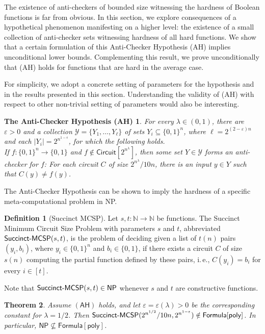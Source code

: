 \documentclass[11pt]{article}
\numberwithin{equation}{section}
\newtheorem{theorem}{Theorem}[section]
\theoremstyle{definition}
\newtheorem{definition}[theorem]{Definition}
\theoremstyle{plain}
\newcommand{\ie}{i.\,e.}
\newtheorem*{antichecker}{The Anti-Checker Hypothesis (AH)}
\newcommand{\MCSP}{\ensuremath{{\sf MCSP}}\xspace}
\newcommand{\Succinct}{\ensuremath{{\sf Succinct}\text{-}\ensuremath{\MCSP}}\xspace}
\begin{document}
The existence of anti-checkers of bounded size witnessing the hardness of Boolean functions is far from obvious. In this section, we explore consequences of a hypothetical phenomenon manifesting on a higher level: the existence of a small collection of anti-checker sets witnessing hardness of all hard functions. We show that a certain formulation of this Anti-Checker Hypothesis (AH) implies unconditional lower bounds. Complementing this result, we prove unconditionally that (AH) holds for functions that are hard in the average case.
 
For simplicity, we adopt a concrete setting of parameters for the hypothesis and in the results presented in this section. Understanding the validity of (AH) with respect to other non-trivial setting of parameters would also be interesting.

\begin{antichecker} For every $\lambda\in (0,1)$, there are $\varepsilon >0$ and a collection $\mathcal{Y} = \{Y_1, \ldots, Y_\ell\}$ of sets $Y_i \subseteq \{0,1\}^n$, where $\ell = 2^{(2 - \varepsilon)n}$ and each $|Y_i| = 2^{n^{1-\epsilon}}$, for which the following holds.\\

\vspace{-0.3cm}
If $f \colon \{0,1\}^n \to \{0,1\}$ and $f \notin \mathsf{Circuit}[2^{n^{\lambda}}]$, then some set $Y \in \mathcal{Y}$ forms an anti-checker for $f$\emph{:} For each circuit $C$ of size $2^{n^{\lambda}}/10n$, there is an input $y\in Y$ such that $C(y)\ne f(y)$.
\end{antichecker}

The Anti-Checker Hypothesis  can be shown to imply the hardness of a specific meta-computational problem in NP.

\begin{definition}[Succinct MCSP] Let $s,t \colon \mathbb{N}\rightarrow \mathbb{N}$ be functions. The Succinct Minimum Circuit Size Problem with parameters $s$ and $t$, abbreviated $\Succinct(s,t)$, is the problem of deciding given a list of $t(n)$ pairs $(y_i,b_i)$, where $y_i\in\{0,1\}^n$ and $b_i\in\{0,1\}$, if there exists a circuit $C$ of size $s(n)$ computing the partial function defined by these pairs, \ie, $C(y_i)=b_i$ for every $i \in [t]$.
\end{definition}

Note that $\Succinct(s,t) \in \mathsf{NP}$ whenever $s$ and $t$ are constructive functions. 


\begin{theorem}\label{thm:AH_implication} Assume $(\mathsf{AH})$ holds, and let $\varepsilon = \varepsilon(\lambda)  > 0$ be the corresponding constant for $\lambda = 1/2$. Then $\Succinct(2^{n^{1/2}}/10n, 2^{n^{1 - \varepsilon}}) \notin \mathsf{Formula}[\mathsf{poly}]$. In particular, $\mathsf{NP} \nsubseteq \mathsf{Formula}[\mathsf{poly}]$.
\end{theorem}
\end{document}
